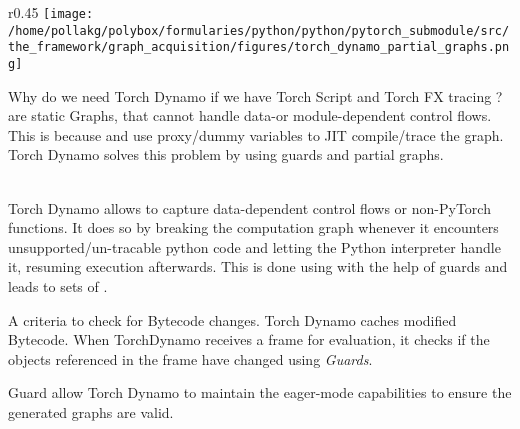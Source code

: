 \begin{sectionbox}\nospacing
    \begin{wrapfigure}{r}{0.45\linewidth}
        \centering
        \vspace{-10pt}
        \texttt{[image: /home/pollakg/polybox/formularies/python/python/pytorch\_submodule/src/the\_framework/graph\_acquisition/figures/torch\_dynamo\_partial\_graphs.png]}
    \end{wrapfigure}
    Why do we need Torch Dynamo if we have Torch Script  and
    Torch FX tracing ?\\
     are static Graphs, that cannot handle data-or module-dependent control flows.
    This is because  and  use proxy/dummy variables to JIT compile/trace the graph.
    Torch Dynamo solves this problem by using guards and partial graphs.
\end{sectionbox}
\begin{corbox}\nospacing
    \begin{cor}\label{cor:partial_graphs}\leavevmode\\
        Torch Dynamo allows to capture data-dependent control flows or non-PyTorch functions.
        It does so by breaking the computation graph whenever it encounters unsupported/un-tracable python code and letting the Python interpreter handle it, resuming
        execution afterwards.
        This is done using with the help of guards and leads to sets of .
    \end{cor}
\end{corbox}
\begin{defnbox}\nospacing
    \begin{defn}[Guards]\label{defn:guards}
        A criteria to check for Bytecode changes.
        Torch Dynamo caches modified Bytecode.
        When TorchDynamo receives a frame for evaluation, it checks if the objects referenced in the frame have changed using
        \textit{Guards}.
    \end{defn}
\end{defnbox}
\begin{notebox}[Note]\nospacing
      Guard allow Torch Dynamo to maintain the eager-mode capabilities to ensure the generated graphs are valid.
\end{notebox}

